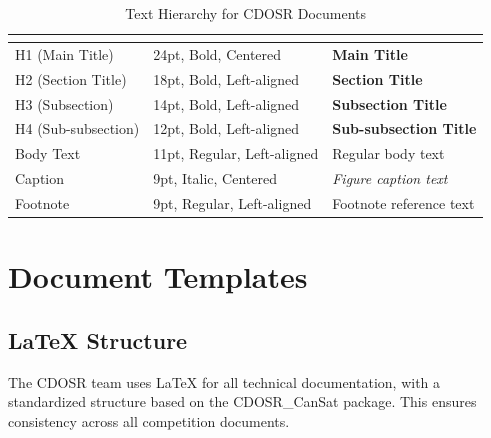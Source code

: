 \documentclass[11pt]{article}
\begin{document}
\begin{table}[h]
\centering
{}
\begin{tabular}{lll}
\hline
\rowcolor{CDOSRPrimary}
\textbf{\color{white!50}{Element}} & \textbf{\color{white!50}{Formatting}} & \textbf{\color{white!50}{Example}} \\
\hline
H1 (Main Title) & 24pt, Bold, Centered & {\Large\bfseries Main Title} \\
\rowcolor{CDOSRSecondary!30}
H2 (Section Title) & 18pt, Bold, Left-aligned & {\large\bfseries Section Title} \\
H3 (Subsection) & 14pt, Bold, Left-aligned & {\normalsize\bfseries Subsection Title} \\
\rowcolor{CDOSRSecondary!30}
H4 (Sub-subsection) & 12pt, Bold, Left-aligned & {\small\bfseries Sub-subsection Title} \\
Body Text & 11pt, Regular, Left-aligned & Regular body text \\
\rowcolor{CDOSRSecondary!30}
Caption & 9pt, Italic, Centered & {\footnotesize\itshape Figure caption text} \\
Footnote & 9pt, Regular, Left-aligned & {\footnotesize Footnote reference text} \\
\hline
\end{tabular}
\caption{\small{Text Hierarchy for CDOSR Documents}}
\end{table}

\section{Document Templates}

\subsection{LaTeX Structure}

The CDOSR team uses LaTeX for all technical documentation, with a standardized structure based on the CDOSR\_CanSat package. This ensures consistency across all competition documents.
\end{document}
